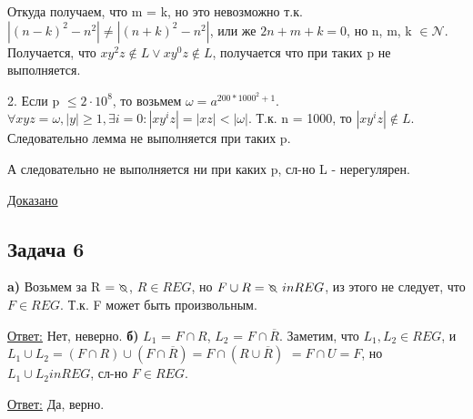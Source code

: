 \documentclass[a4paper,14pt]{article} %
\begin{document}
    Откуда получаем, что m = k, но это невозможно т.к. $|(n-k)^2-n^2| \neq |(n+k)^2 -n^2|$, или же $2n+m+k = 0$, но n, m, k $\in \mathcal{N}$.
    Получается, что $xy^2z \notin L \vee xy^0z \notin L$, получается что при таких p не выполняется.

    2. Если p $\leqslant 2 \cdot 10^8$, то возьмем $\omega = a^{200*1000^2 + 1}$. $\forall xyz = \omega, |y| \geqslant 1, \exists i = 0 : |xy^iz| = |xz| < |\omega|$. Т.к. n = 1000, то $|xy^iz| \notin L$.
    Следовательно лемма не выполняется при таких p.

    А следовательно не выполняется ни при каких p, сл-но L - нерегулярен.
    
    \underline{Доказано}

    \subsection{Задача 6}
    \textbf{a)} Возьмем за R $= \invdiameter$, $R \in REG$, но $F \cup R = \invdiameter \ in REG$, из этого не следует, что $F \in REG$.
    Т.к. F может быть произвольным. 
    
    \underline{Ответ:} Нет, неверно.
    \newline
    \textbf{б)} $L_1$ = $F \cap R$, $L_2$ = $F \cap \overline{R}$.
    Заметим, что $L_1, L_2 \in REG$, и $L_1 \cup L_2 = (F \cap R) \cup (F \cap \overline{R}) = F \cap (R \cup \overline{R})$
    $= F \cap U = F$, но $L_1 \cup L_2 in REG$, сл-но $F \in REG$.
    
    \underline{Ответ:} Да, верно.
\end{document}
